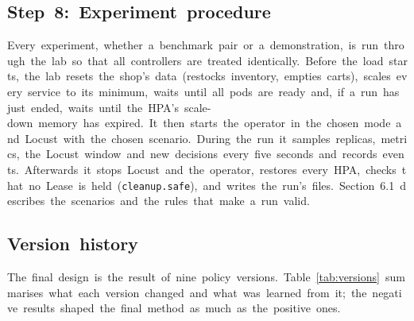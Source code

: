 \documentclass[12pt,a4paper,oneside]{report}
\begin{document}
\subsection{Step~8:~Experiment~procedure}

Every~experiment,~whether~a~benchmark~pair~or~a~demonstration,~is~run~through~the~lab~so~that~all~controllers~are~treated~identically.~Before~the~load~starts,~the~lab~resets~the~shop's~data~(restocks~inventory,~empties~carts),~scales~every~service~to~its~minimum,~waits~until~all~pods~are~ready~and,~if~a~run~has~just~ended,~waits~until~the~HPA's~scale-down~memory~has~expired.~It~then~starts~the~operator~in~the~chosen~mode~and~Locust~with~the~chosen~scenario.~During~the~run~it~samples~replicas,~metrics,~the~Locust~window~and~new~decisions~every~five~seconds~and~records~events.~Afterwards~it~stops~Locust~and~the~operator,~restores~every~HPA,~checks~that~no~Lease~is~held~(\texttt{cleanup.\allowbreak{}safe}),~and~writes~the~run's~files.~Section~6.1~describes~the~scenarios~and~the~rules~that~make~a~run~valid.


\subsection{Version~history}

The~final~design~is~the~result~of~nine~policy~versions.~Table~\ref{tab:versions}~summarises~what~each~version~changed~and~what~was~learned~from~it;~the~negative~results~shaped~the~final~method~as~much~as~the~positive~ones.
\end{document}
